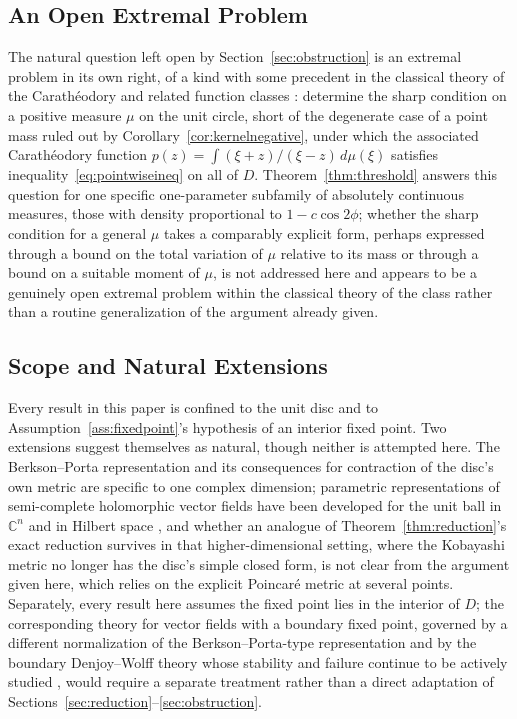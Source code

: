 \documentclass[pdflatex,sn-mathphys-num]{sn-jnl}%
\theoremstyle{thmstyleone}%
\theoremstyle{thmstyletwo}%
\theoremstyle{thmstylethree}%
\begin{document}
\subsection{An Open Extremal Problem}

The natural question left open by Section~\ref{sec:obstruction} is an extremal problem in its own right, of a kind with some precedent in the classical theory of the Carath\'eodory and related function classes \cite{ahlfors1979complex}: determine the sharp condition on a positive measure $\mu$ on the unit circle, short of the degenerate case of a point mass ruled out by Corollary~\ref{cor:kernelnegative}, under which the associated Carath\'eodory function $p(z)=\int(\xi+z)/(\xi-z)\,d\mu(\xi)$ satisfies inequality~\eqref{eq:pointwiseineq} on all of $D$. Theorem~\ref{thm:threshold} answers this question for one specific one-parameter subfamily of absolutely continuous measures, those with density proportional to $1-c\cos2\phi$; whether the sharp condition for a general $\mu$ takes a comparably explicit form, perhaps expressed through a bound on the total variation of $\mu$ relative to its mass or through a bound on a suitable moment of $\mu$, is not addressed here and appears to be a genuinely open extremal problem within the classical theory of the class rather than a routine generalization of the argument already given.

\subsection{Scope and Natural Extensions}

Every result in this paper is confined to the unit disc and to Assumption~\ref{ass:fixedpoint}'s hypothesis of an interior fixed point. Two extensions suggest themselves as natural, though neither is attempted here. The Berkson--Porta representation and its consequences for contraction of the disc's own metric are specific to one complex dimension; parametric representations of semi-complete holomorphic vector fields have been developed for the unit ball in $\mathbb{C}^n$ and in Hilbert space \cite{aharonov1999parametric}, and whether an analogue of Theorem~\ref{thm:reduction}'s exact reduction survives in that higher-dimensional setting, where the Kobayashi metric no longer has the disc's simple closed form, is not clear from the argument given here, which relies on the explicit Poincar\'e metric at several points. Separately, every result here assumes the fixed point lies in the interior of $D$; the corresponding theory for vector fields with a boundary fixed point, governed by a different normalization of the Berkson--Porta-type representation and by the boundary Denjoy--Wolff theory whose stability and failure continue to be actively studied \cite{bracci2025failure,christodoulou2021stability}, would require a separate treatment rather than a direct adaptation of Sections~\ref{sec:reduction}--\ref{sec:obstruction}.
\end{document}
